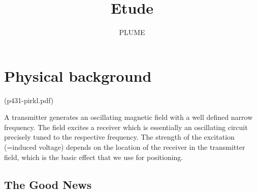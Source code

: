 \documentclass[a4paper,11pt]{article}
\author{PLUME}
\title{Etude}
\begin{document}
\maketitle
\tableofcontents

\section{Physical background}

(p431-pirkl.pdf)

A transmitter generates
an oscillating magnetic field with a well defined narrow
frequency. The field excites a receiver which is essentially
an oscillating circuit precisely tuned to the respective frequency.
The strength of the excitation (=induced voltage)
depends on the location of the receiver in the transmitter
field, which is the basic effect that we use for positioning.

\subsection{The Good News}
\end{document}
